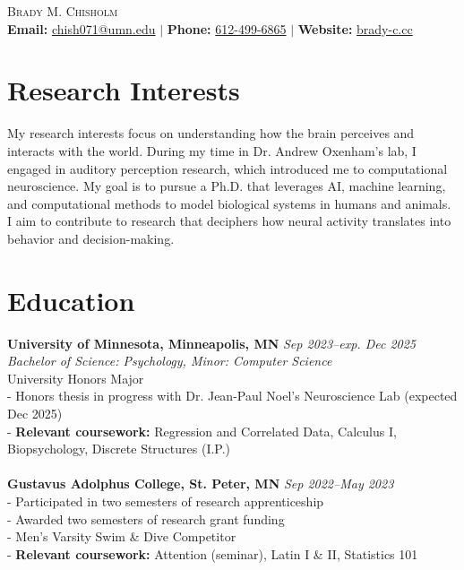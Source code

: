 \documentclass[12pt, a4paper]{article}
\begin{document}
\begin{center}
    {\Large \textsc{Brady M. Chisholm}} \\[0.3em] %
    \normalsize
    \textbf{Email:} \href{mailto:chish071@umn.edu}{chish071@umn.edu} \quad $|$ \quad
    \textbf{Phone:} \href{null}{612-499-6865} \quad $|$ \quad
    \textbf{Website:} \href{http://brady-c.cc}{brady-c.cc} \\
\end{center}

\vspace{0.5em}
\section*{Research Interests}
My research interests focus on understanding how the brain perceives and interacts with the world. 
During my time in Dr. Andrew Oxenham's lab, I engaged in auditory perception research, which introduced 
me to computational neuroscience. My goal is to pursue a Ph.D. that leverages AI, machine learning, and 
computational methods to model biological systems in humans and animals. I aim to contribute to research 
that deciphers how neural activity translates into behavior and decision-making.

\section*{Education}
\textbf{University of Minnesota, Minneapolis, MN} \hfill \textit{Sep 2023--exp. Dec 2025} \\
\textit{Bachelor of Science: Psychology, Minor: Computer Science} \\
University Honors Major \\
- Honors thesis in progress with Dr. Jean-Paul Noel's Neuroscience Lab (expected Dec 2025) \\
- \textbf{Relevant coursework:} Regression and Correlated Data, Calculus I, Biopsychology, Discrete Structures (I.P.)\\
\\
\textbf{Gustavus Adolphus College, St. Peter, MN} \hfill \textit{Sep 2022--May 2023} \\
- Participated in two semesters of research apprenticeship \\
- Awarded two semesters of research grant funding \\
- Men’s Varsity Swim \& Dive Competitor \\
- \textbf{Relevant coursework:} Attention (seminar), Latin I \& II, Statistics 101
\end{document}
